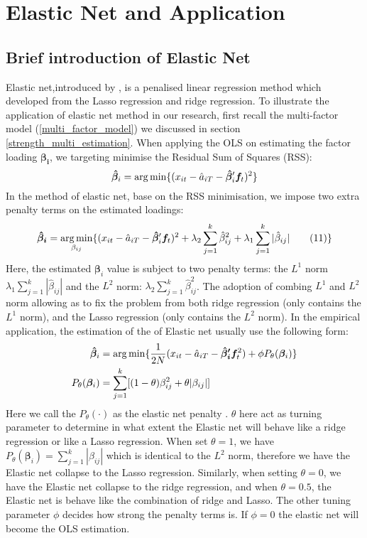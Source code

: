 \section{Elastic Net and Application}


\subsection{Brief introduction of Elastic Net} \label{Elastic_Net}

Elastic net,introduced by ,  is a penalised linear regression method which developed from the Lasso regression \cite{Tibshirani1996} and ridge regression.
To illustrate the application of elastic net method in our research, first recall the multi-factor model (\ref{multi_factor_model}) we discussed in section \ref{strength_multi_estimation}.
When applying the OLS on estimating the factor loading $\bm{\beta_{i}}$, we targeting minimise the Residual Sum of Squares (RSS):
\[  \bm{\hat{\beta}}_i =   \operatorname*{arg\,min}\{  (x_{it} - \hat{a}_{iT} - \bm{\hat{\beta}}_i^{\prime}\bm{f}_t )^2 \}    \]
In the method of elastic net, base on the RSS minimisation, we impose two extra penalty terms on the estimated loadings:
\[   \bm{\hat{\beta}_{i}}  = \operatorname*{arg\,min}_{\beta_{ij}}\{ (x_{it} - \hat{a}_{iT} - \bm{\hat{\beta}}_{i} ^{\prime}\bm{f}_{t})^2 + \lambda_2\sum_{j = 1}^k\hat{\beta}_{ij}^2  + \lambda_1\sum_{j=1}^k|\hat{\beta}_{ij}|  \label{ENcriterion} \tag{11}   \}    \]
Here, the estimated $\bm{\beta}_i$ value is subject to two penalty terms: the $L^1$ norm $\lambda_1\sum_{j=1}^k|\hat{\beta}_{ij}|$ and the $L^2$ norm: $\lambda_2\sum_{j = 1}^k\hat{\beta}_{ij}^2$.
The adoption of combing $L^1$ and $L^2$ norm allowing as to fix the problem from both ridge regression (only contains the $L^1$ norm), and the Lasso regression (only contains the $L^2$ norm).
In the empirical application, the estimation of the of Elastic net usually use the following form:
\begin{align*}
	\bm{\hat{\beta}}_{i} &= \operatorname*{arg\,min}\{ \frac{1}{2N} (x_{it}-\hat{a}_{iT} - \bm{\hat{\beta}_{i}^{\prime}}\bm{f}_t ^2 ) +\phi P_{\theta}(\bm{\beta}_i)  \}\\
	P_{\theta}(\bm{\beta}_i) &=\sum_{j=1}^k [ (1-\theta)\beta_{ij}^2 + \theta |\beta_{ij}|]
\end{align*}
Here we call the $P_{\theta}(\cdot)$ as the elastic net penalty \cite{Friedman2010}.
$\theta$ here act as turning parameter to determine in what extent the Elastic net will behave like a ridge regression or like a Lasso regression.
When set $\theta = 1$, we have $P_{\theta}(\bm{\beta}_i) =\sum_{j=1}^k  |\beta_{ij}|$ which is identical to the $L^2$ norm, therefore we have the Elastic net collapse to the Lasso regression.
Similarly, when setting $\theta = 0$, we have the Elastic net collapse to the ridge regression, and when $\theta = 0.5$, the Elastic net is behave like the combination of ridge and Lasso.
The other tuning parameter $\phi$ decides how strong the penalty terms is.
If $\phi = 0$ the elastic net will become the OLS estimation.

